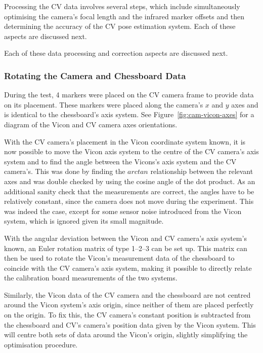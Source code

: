 Processing the CV data involves several steps, which include simultaneously optimising the camera's focal length and the infrared marker offsets and then determining the accuracy of the CV pose estimation system. Each of these aspects are discussed next.

Each of these data processing and correction aspects are discussed next. 

\subsubsection{Rotating the Camera and Chessboard Data}
\label{sec:rotate-axes}

During the test, 4 markers were placed on the CV camera frame to provide data on its placement. These markers were placed along the camera's $x$ and $y$ axes and is identical to the chessboard's axis system. See Figure~\ref{fig:cam-vicon-axes} for a diagram of the Vicon and CV camera axes orientations.

With the CV camera's placement in the Vicon coordinate system known, it is now possible to move the Vicon axis system to the centre of the CV camera's axis system and to find the angle between the Vicons's axis system and the CV camera's. This was done by finding the $arctan$ relationship between the relevant axes and was double checked by using the cosine angle of the dot product. As an additional sanity check that the measurements are correct, the angles have to be relatively constant, since the camera does not move during the experiment. This was indeed the case, except for some sensor noise introduced from the Vicon system, which is ignored given its small magnitude. 

With the angular deviation between the Vicon and CV camera's axis system's known, an Euler rotation matrix of type 1--2--3 can be set up. This matrix can then be used to rotate the Vicon's measurement data of the chessboard to coincide with the CV camera's axis system, making it possible to directly relate the calibration board measurements of the two systems. 

Similarly, the Vicon data of the CV camera and the chessboard are not centred around the Vicon system's axis origin, since neither of them are placed perfectly on the origin. To fix this, the CV camera's constant position is subtracted from the chessboard and CV's camera's position data given by the Vicon system. This will centre both sets of data around the Vicon's origin, slightly simplifying the optimisation procedure. 

